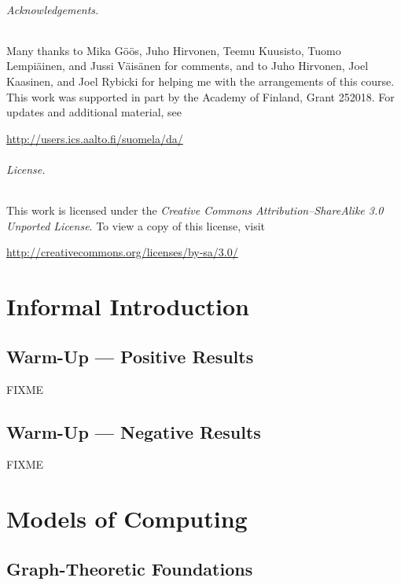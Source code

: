 \paragraph{Acknowledgements.}

Many thanks to Mika G\"o\"os, Juho Hirvonen, Tee\-mu Kuu\-sisto, Tuo\-mo Lem\-pi\"a\-inen, and Jussi V\"ai\-s\"a\-nen for comments, and to Juho Hirvonen, Joel Kaasinen, and Joel Rybicki for helping me with the arrangements of this course. This work was supported in part by the Academy of Finland, Grant 252018. For updates and additional material, see
\begin{center}
    \url{http://users.ics.aalto.fi/suomela/da/}
\end{center}

\paragraph{License.}

This work is licensed under the \emph{Creative Commons Attribution--ShareAlike 3.0 Unported License}. To view a copy of this license, visit
\begin{center}
    \url{http://creativecommons.org/licenses/by-sa/3.0/}
\end{center}

\mainmatter
\part{Informal Introduction}

\chapter{Warm-Up --- Positive Results}

FIXME

\chapter{Warm-Up --- Negative Results}

FIXME

\part{Models of Computing}

\chapter{Graph-Theoretic Foundations}

